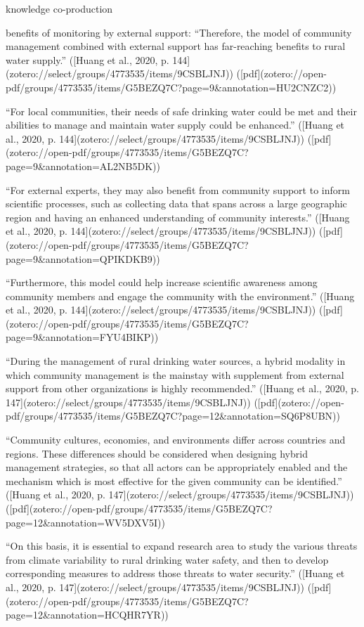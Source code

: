 {knowledge co-production
\autocite{dasInteractiveInformationCrowdsourcing2016}

benefits of monitoring by external support:
“Therefore, the model of community management combined with external support has far-reaching benefits to rural water supply.” ([Huang et al., 2020, p. 144](zotero://select/groups/4773535/items/9CSBLJNJ)) ([pdf](zotero://open-pdf/groups/4773535/items/G5BEZQ7C?page=9&annotation=HU2CNZC2))

“For local communities, their needs of safe drinking water could be met and their abilities to manage and maintain water supply could be enhanced.” ([Huang et al., 2020, p. 144](zotero://select/groups/4773535/items/9CSBLJNJ)) ([pdf](zotero://open-pdf/groups/4773535/items/G5BEZQ7C?page=9&annotation=AL2NB5DK))

“For external experts, they may also benefit from community support to inform scientific processes, such as collecting data that spans across a large geographic region and having an enhanced understanding of community interests.” ([Huang et al., 2020, p. 144](zotero://select/groups/4773535/items/9CSBLJNJ)) ([pdf](zotero://open-pdf/groups/4773535/items/G5BEZQ7C?page=9&annotation=QPIKDKB9))

“Furthermore, this model could help increase scientific awareness among community members and engage the community with the environment.” ([Huang et al., 2020, p. 144](zotero://select/groups/4773535/items/9CSBLJNJ)) ([pdf](zotero://open-pdf/groups/4773535/items/G5BEZQ7C?page=9&annotation=FYU4BIKP))

“During the management of rural drinking water sources, a hybrid modality in which community management is the mainstay with supplement from external support from other organizations is highly recommended.” ([Huang et al., 2020, p. 147](zotero://select/groups/4773535/items/9CSBLJNJ)) ([pdf](zotero://open-pdf/groups/4773535/items/G5BEZQ7C?page=12&annotation=SQ6P8UBN))

“Community cultures, economies, and environments differ across countries and regions. These differences should be considered when designing hybrid management strategies, so that all actors can be appropriately enabled and the mechanism which is most effective for the given community can be identified.” ([Huang et al., 2020, p. 147](zotero://select/groups/4773535/items/9CSBLJNJ)) ([pdf](zotero://open-pdf/groups/4773535/items/G5BEZQ7C?page=12&annotation=WV5DXV5I))

“On this basis, it is essential to expand research area to study the various threats from climate variability to rural drinking water safety, and then to develop corresponding measures to address those threats to water security.” ([Huang et al., 2020, p. 147](zotero://select/groups/4773535/items/9CSBLJNJ)) ([pdf](zotero://open-pdf/groups/4773535/items/G5BEZQ7C?page=12&annotation=HCQHR7YR))

}
